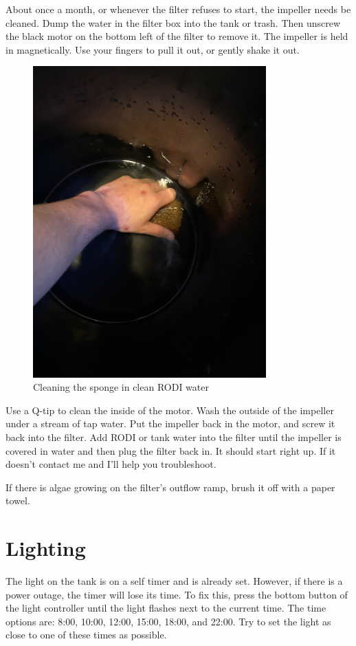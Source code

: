 \documentclass{report}
\begin{document}
About once a month, or whenever the filter refuses to start, the impeller needs be cleaned. Dump the water in the filter box 
into the tank or trash. Then unscrew the black motor on the bottom left of the filter to remove it. The impeller is held in 
magnetically. Use your fingers to pull it out, or gently shake it out. 

\begin{figure}[H]
    \centering
    \includegraphics[width=0.8\textwidth]{CleanSponge.jpg}
    \caption{Cleaning the sponge in clean RODI water}
\end{figure}

Use a Q-tip to clean the inside of the motor. Wash the outside of the impeller under a stream of tap water. Put the impeller 
back in the motor, and screw it back into the filter. Add RODI or tank water into the filter until the impeller is covered in 
water and then plug the filter back in. It should start right up. If it doesn't contact me and I'll help you troubleshoot.

If there is algae growing on the filter's outflow ramp, brush it off with a paper towel. 

\section{Lighting}
The light on the tank is on a self timer and is already set. However, if there is a power outage, the timer will lose its
time. To fix this, press the bottom button of the light controller until the light flashes next to the current time. The time 
options are: 8:00, 10:00, 12:00, 15:00, 18:00, and 22:00. Try to set the light as close to one of these times as possible. 
\end{document}
